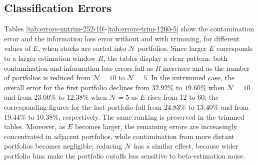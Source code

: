 \subsection{Classification Errors}
\label{app:Classification Errors}

Tables \ref{tab:errors-untrim-252-10}-\ref{tab:errors-trim-1260-5} show the contamination error and the information loss error without and with trimming, for different values of $E$, when stocks are sorted into $\mathcal{N}$ portfolios. Since larger $E$ corresponds to a larger estimation window $R$, the tables display a clear pattern: both contamination and information-loss errors fall as $R$ increases and as the number of portfolios is reduced from $\mathcal{N}=10$ to $\mathcal{N}=5$. In the untrimmed case, the overall error for the first portfolio declines from $32.92\%$ to $19.60\%$ when $\mathcal{N}=10$ and from $23.00\%$ to $12.38\%$ when $\mathcal{N}=5$ as $E$ rises from $12$ to $60$; the corresponding figures for the last portfolio fall from $24.83\%$ to $13.40\%$ and from $19.44\%$ to $10.38\%$, respectively. The same ranking is preserved in the trimmed tables. Moreover, as $E$ becomes larger, the remaining errors are increasingly concentrated in adjacent portfolios, while contamination from more distant portfolios becomes negligible; reducing $\mathcal{N}$ has a similar effect, because wider portfolio bins make the portfolio cutoffs less sensitive to beta-estimation noise.

 

 

 

 

 



 

 

 

 

 

 